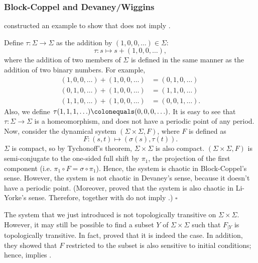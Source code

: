 \documentclass[10pt,twoside,draft]{book}
\begin{document}
\subsubsection*{Block-Coppel and Devaney/Wiggins}
\citet{aulbach} constructed an example to show that \blcp does not imply \dev.
\begin{example}
  \citep{aulbach} 
  Define $\tau: \Sigma \to \Sigma$ as the addition by $(1, 0, 0, \ldots) \in \Sigma$:
  \begin{equation*}
    \tau: s \mapsto s + (1, 0, 0, \ldots),
  \end{equation*}
  where the addition of two members of $\Sigma$ is defined in the same manner as the addition of two binary numbers.
  For example, 
  \begin{align*}
    (1, 0, 0, \ldots) + (1, 0, 0, \ldots) &= (0, 1, 0, \ldots) \\
    (0, 1, 0, \ldots) + (1, 0, 0, \ldots) &= (1, 1, 0, \ldots) \\
    (1, 1, 0, \ldots) + (1, 0, 0, \ldots) &= (0, 0, 1, \ldots).
  \end{align*}
  Also, we define $\tau(1,1,1, \ldots) \ceq (0,0,0, \ldots)$.
  It is easy to see that $\tau: \Sigma \to \Sigma$ is a homeomorphism, and does not have a periodic point of any period.
  Now, consider the dynamical system $(\Sigma \times \Sigma, F)$, where $F$ is defined as
  \begin{equation*}
    F: (s, t) \mapsto (\sigma(s), \tau(t)).
  \end{equation*}
  $\Sigma$ is compact, so by Tychonoff's theorem, $\Sigma \times \Sigma$ is also compact.
  $(\Sigma \times \Sigma, F)$ is semi-conjugate to the one-sided full shift by $\pi_1$, the projection of the first component (i.e. $\pi_1 \circ F = \sigma \circ \pi_1$).
  Hence, the system is chaotic in Block-Coppel's sense.
  However, the system is not chaotic in Devaney's sense, because it doesn't have a periodic point.
  (Moreover, \citet{blockcoppel} proved that the system is also chaotic in Li-Yorke's sense.
  Therefore, \blcp together with \liy do not imply \dev.)
  $\square$
\end{example}
The system that we just introduced is not topologically transitive on $\Sigma \times \Sigma$.
However, it may still be possible to find a subset $Y$ of $\Sigma \times \Sigma$ such that $F_{|Y}$ is topologically transitive.
In fact, \citet{auslander} proved that it is indeed the case.
In addition, they showed that $F$ restricted to the subset is also sensitive to initial conditions; hence, \blcp implies \wig.
\end{document}
